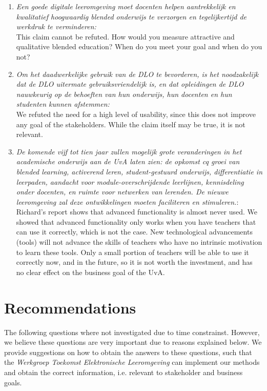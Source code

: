 \begin{enumerate}
	\item \textit{Een goede digitale leeromgeving moet docenten helpen aantrekkelijk en kwalitatief hoogwaardig blended
	onderwijs te verzorgen en tegelijkertijd de werkdruk te verminderen:} \\This claim cannot be refuted. How would you measure attractive and qualitative blended education? When do you meet your goal and when do you not?
	\item \textit{Om het daadwerkelijke gebruik van de DLO te bevorderen, is het noodzakelijk dat de DLO uitermate
	gebruiksvriendelijk is, en dat opleidingen de DLO nauwkeurig op de behoeften van hun onderwijs, hun
	docenten en hun studenten kunnen afstemmen:} \\ We refuted the need for a high level of usability, since this does not improve any goal of the stakeholders. While the claim itself may be true, it is not relevant.
	\item \textit{De komende vijf tot tien jaar zullen mogelijk grote veranderingen in het academische onderwijs aan de
	UvA laten zien: de opkomst cq groei van blended learning, activerend leren, student-gestuurd onderwijs,
	differentiatie in leerpaden, aandacht voor module-overschrijdende leerlijnen, kennisdeling onder docenten,
	en ruimte voor netwerken van lerenden. De nieuwe leeromgeving zal deze ontwikkelingen moeten
	faciliteren en stimuleren.}: \\ Richard's report shows that advanced functionality is almost never used. We showed that advanced functionality only works when you have teachers that can use it correctly, which is not the case. New technological advancements (tools) will not advance the skills of teachers who have no intrinsic motivation to learn these tools. Only a small portion of teachers will be able to use it correctly now, and in the future, so it is not worth the investment, and has no clear effect on the business goal of the UvA.
\end{enumerate}

\chapter{Recommendations}
The following questions where not investigated due to time constrainst. However, we believe these questions are very important due to reasons explained below. We provide suggestions on how to obtain the answers to these questions, such that the \textit{Werkgroep Toekomst Elektronische Leeromgeving} can implement our methods and obtain the correct information, i.e. relevant to stakeholder and business goals.

